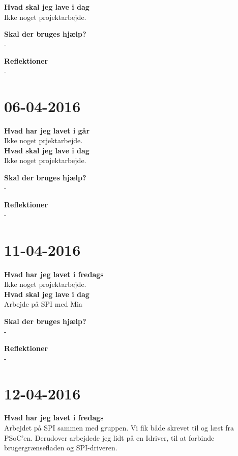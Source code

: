 \documentclass{article}
\begin{document}
	\textbf{Hvad skal jeg lave i dag}\\
	Ikke noget projektarbejde.
	
	\textbf{Skal der bruges hjælp?}\\
	-
	
	\textbf{Reflektioner}\\
	-
	
	
	
	\section{06-04-2016}
	
	\textbf{Hvad har jeg lavet i går}\\
	Ikke noget prjektarbejde.\\
	
	\textbf{Hvad skal jeg lave i dag}\\
	Ikke noget projektarbejde. 
	
	\textbf{Skal der bruges hjælp?}\\
	-
	
	\textbf{Reflektioner}\\
	-
	
	
	\section{11-04-2016}
	
	\textbf{Hvad har jeg lavet i fredags}\\
	Ikke noget projektarbejde.\\
	
	\textbf{Hvad skal jeg lave i dag}\\
	Arbejde på SPI med Mia
	
	\textbf{Skal der bruges hjælp?}\\
	-
	
	\textbf{Reflektioner}\\
	-
	
	

	\section{12-04-2016}
	
	\textbf{Hvad har jeg lavet i fredags}\\
	Arbejdet på SPI sammen med gruppen. Vi fik både skrevet til og læst fra PSoC'en. Derudover arbejdede jeg lidt på en Idriver, til at forbinde brugergrænsefladen og SPI-driveren.\\
	
\end{document}
